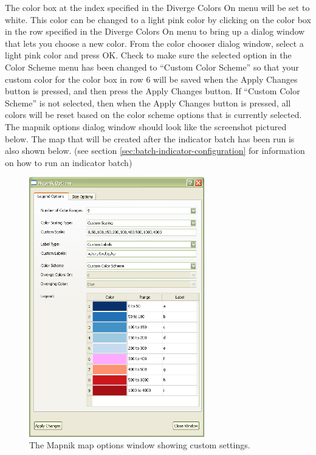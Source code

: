 The color box at the index specified in the Diverge Colors On menu 
will be set to white. This color can be changed to a light pink 
color by clicking on the color box in the row specified in 
the Diverge Colors On menu to bring up a dialog window that lets 
you choose a new color. From the color chooser dialog window, select 
a light pink color and press OK.  Check to make sure the selected option in the 
Color Scheme menu has been changed to ``Custom Color Scheme'' so that your custom color 
for the color box in row 6 will be saved when the Apply Changes button 
is pressed, and then press the Apply Changes button. If 
``Custom Color Scheme'' is not selected, then when the Apply Changes 
button is pressed, all colors will be reset based on the color scheme
options that is currently selected. The mapnik 
options dialog window should look like the screenshot pictured below. 
The map that will be created after the indicator batch has been run 
is also shown below. (see section \ref{sec:batch-indicator-configuration} 
for information on how to run an indicator batch)

\begin{figure}[hb]
\begin{center}
\includegraphics[width=3in]{part-gui/images/result-manager-custom-mapnik-settings.png}
\end{center}
\caption{The Mapnik map options window showing custom settings.}
\label{fig:result-manager-custom-mapnik-settings}
\end{figure}
\clearpage

